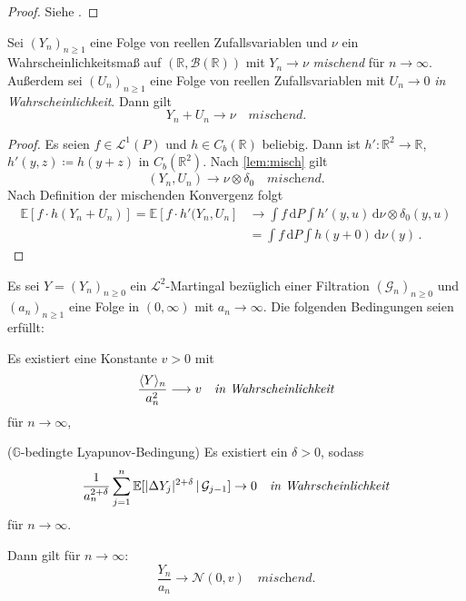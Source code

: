 \documentclass[ngerman,a4paper,11pt]{scrartcl}
\newcommand{\EE}{\mathbb{E}}
\newcommand{\GG}{\mathbb{G}}
\newcommand{\RR}{\mathbb{R}}
\newcommand{\bb}{\mathcal{B}}
\renewcommand{\gg}{\mathcal{G}}
\renewcommand{\ll}{\mathcal{L}}
\newcommand{\nn}{\mathcal{N}}
\newcommand{\Cb}[1]{C_b(#1)}
\newcommand{\expect}[1]{\EE[#1]}
\newcommand{\condexp}[2]{\EE[#1\,|\,#2]}
\newcommand{\dvar}[1]{\,\mathrm{d}#1}
\DeclarePairedDelimiter{\sprod}{\langle}{\rangle}	%
\DeclarePairedDelimiter{\abs}{\lvert}{\rvert}		%
\begin{document}
\begin{proof}
 Siehe \cite[Korollar~5.29(a)]{lpw}.
\end{proof}
\begin{cor}\label{cor:mischsum}
  Sei $(Y_n)_{n\geq 1}$ eine Folge von reellen Zufallsvariablen und $\nu$ ein
  Wahrscheinlichkeitsmaß auf $(\RR,\bb(\RR))$ mit $Y_n\to\nu$ \textit{mischend}
  für $n\to\infty$. Außerdem sei $(U_n)_{n\geq 1}$ eine Folge von reellen
  Zufallsvariablen mit $U_n\to 0$ \textit{in Wahrscheinlichkeit}. Dann gilt
\begin{equation*}
 Y_n + U_n\to\nu\quad\textit{mischend.}
\end{equation*}
\end{cor}
\begin{proof}
  Es seien $f\in\ll^1(P)$ und $h\in\Cb{\RR}$ beliebig. Dann ist
  $h':\RR^2\to\RR$, $h'(y,z)\coloneqq h(y+z)$ in $\Cb{\RR^2}$. Nach
  \cref{lem:misch} gilt
\begin{equation*}
 (Y_n,U_n)\to\nu\otimes\delta_0\quad\textit{mischend.}
\end{equation*}
Nach Definition der mischenden Konvergenz folgt
\begin{align*}
  \expect{f\cdot h(Y_n+U_n)}=\expect{f\cdot h'(Y_n,U_n}&\to\int f\dvar{P}\int h'(y,u) \dvar{\nu\otimes\delta_0(y,u)}\\
&=\int f\dvar{P}\int h(y+0) \dvar{\nu(y)}\,.
\end{align*}
\end{proof}
\begin{thm}
 Es sei $Y=(Y_n)_{n\geq 0}$  ein $\ll^2$-Martingal bezüglich einer Filtration
 $(\gg_n)_{n\geq 0}$ und $(a_n)_{n\geq 1}$ eine
 Folge in $(0,\infty)$ mit $a_n\to\infty$. Die folgenden Bedingungen seien erfüllt:
 \begin{thmasslist}
 \item Es existiert eine Konstante $v>0$ mit 
   \begin{equation*}
     \frac{\sprod{Y}_n}{a_n^2}\longrightarrow v\quad\textit{in Wahrscheinlichkeit}
   \end{equation*}
   für $n\to\infty$,
 \item ($\GG$-bedingte Lyapunov-Bedingung) Es existiert ein $\delta >0$, sodass 
   \begin{equation*}
    \frac{1}{a_n^{2+\delta}} \sum_{j=1}^n\condexp{\abs{\Delta Y_j}^{2+\delta}}{\gg_{j-1}}\to 0\quad\textit{in Wahrscheinlichkeit}
   \end{equation*}
für ${n\to\infty}$.
 \end{thmasslist}
Dann gilt für ${n\to\infty}$:
\begin{equation*}
 \frac{Y_n}{a_n}\to\nn(0,v)\quad\textit{mischend.} 
\end{equation*}
\end{thm}
\end{document}
